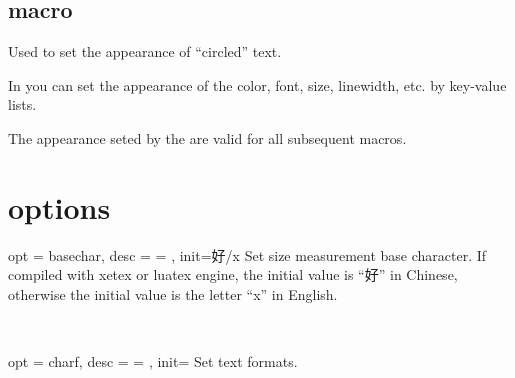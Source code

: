 \documentclass[full]{l3doc}
\begin{document}
\begin{documentation}
\subsection{ macro}

\begin{function}{\circledtextset}
  \begin{syntax}
     
  \end{syntax}
\end{function}

  Used to set the appearance of ``circled'' text.

  In  you can set the appearance of the 
  color, font, size, linewidth, etc. by key-value lists.

  The appearance seted by the  are 
  valid for all subsequent macros.

\section{options}

\begin{option}{ opt = basechar, desc = {= }, init=好/x }
  Set size measurement base character. If compiled with xetex or luatex engine,
  the initial value is ``好'' in Chinese, otherwise the initial value is the 
  letter ``x'' in English.
\end{option}\\
\begin{SideBySideExample}[frame=single,numbers=left,xrightmargin=.45\linewidth,gobble=2]
  \centering
  \quad
  \quad
\end{SideBySideExample}

\bigskip

\begin{option}{ opt = charf, desc = {= }, init= }
  Set text formats.
\end{option}\\
\begin{SideBySideExample}[frame=single,numbers=left,xrightmargin=.45\linewidth,gobble=2]
  \centering
  \qquad
\end{SideBySideExample}

\bigskip


\end{documentation}
\end{document}
